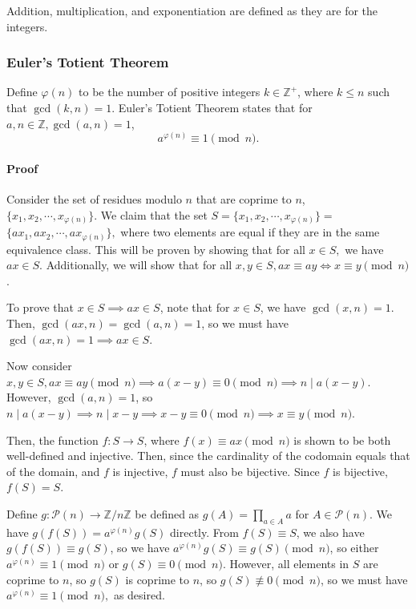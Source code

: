 \documentclass{article}
\newcommand{\Z}{\mathbb{Z}}
\begin{document}
Addition, multiplication, and exponentiation are defined as they are for the integers.

\subsubsection{Euler's Totient Theorem}
Define $\varphi(n)$ to be the number of positive integers $k \in \Z^+$, where $k \le n$ such that $\gcd(k, n) =1$. Euler's Totient Theorem states that for $a, n \in \Z, \gcd(a, n) = 1$,
\[a^{\varphi(n)} \equiv 1 \pmod n.\]
\paragraph{Proof} Consider the set of residues modulo $n$ that are coprime to $n$, \\ $\{x_1, x_2, \cdots, x_{\varphi(n)}\}$. We claim that the set $S = \{x_1, x_2, \cdots, x_{\varphi(n)}\} =$ \\ $ \{a x_1, a x_2, \cdots, a x_{\varphi(n)}\},$ where two elements are equal if they are in the same equivalence class. This will be proven by showing that for all $x \in S,$ we have $ax \in S$. Additionally, we will show that for all $x, y \in S, ax \equiv ay \iff x \equiv y \pmod n$.

To prove that $x \in S \implies ax \in S$, note that for $x \in S$, we have $\gcd(x, n) = 1$. Then, $\gcd(ax, n) = \gcd(a, n) = 1$, so we must have $\gcd(ax, n) = 1 \implies ax \in S$.

Now consider $x, y \in S, ax \equiv ay \pmod n \implies a(x - y) \equiv 0 \pmod n \implies n \mid a(x - y)$. However, $\gcd(a, n) = 1$, so $n \mid a(x-y) \implies n \mid x-y \implies x - y \equiv 0 \pmod n \implies x \equiv y \pmod n$.

Then, the function $f: S \to S$, where $f(x) \equiv ax \pmod n$ is shown to be both well-defined and injective. Then, since the cardinality of the codomain equals that of the domain, and $f$ is injective, $f$ must also be bijective. Since $f$ is bijective, $f(S) = S$.

Define $g: \mathcal P(n) \to \Z/n\Z$ be defined as $g(A) = \prod_{a \in A} a$ for $A \in \mathcal P(n)$. We have $g(f(S)) = a^{\varphi(n)} g(S)$ directly. From $f(S) \equiv S$, we also have $g(f(S)) \equiv g(S)$, so we have $a^{\varphi(n)} g(S) \equiv g(S) \pmod n$, so either $a^{\varphi(n)} \equiv 1 \pmod n$ or $g(S) \equiv 0 \pmod n$. However, all elements in $S$ are coprime to $n$, so $g(S)$ is coprime to $n$, so $g(S) \not \equiv 0 \pmod n$, so we must have $a^{\varphi(n)} \equiv 1 \pmod n,$ as desired.
\end{document}
